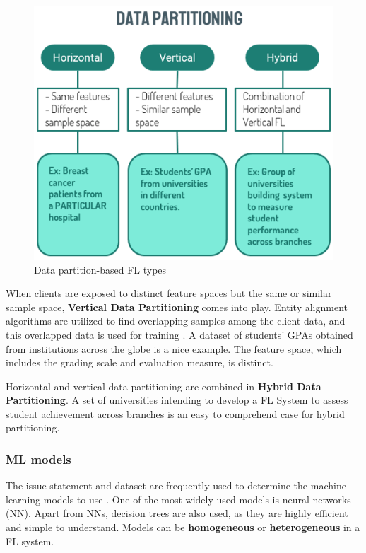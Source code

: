 \begin{figure}[H]
\centering
\includegraphics[scale=0.5]{img/fl_data_partition.png}
\caption{Data partition-based FL types}
\label{fig:fl_data_partition}
\end{figure}

When clients are exposed to distinct feature spaces but the same or similar sample space, \textbf{Vertical Data Partitioning} comes into play. Entity alignment algorithms are utilized to find overlapping samples among the client data, and this overlapped data is used for training \cite{fl26_types}. A dataset of students' GPAs obtained from institutions across the globe is a nice example. The feature space, which includes the grading scale and evaluation measure, is distinct.

Horizontal and vertical data partitioning are combined in \textbf{Hybrid Data Partitioning}. A set of universities intending to develop a FL System to assess student achievement across branches is an easy to comprehend case for hybrid partitioning.

\subsubsection{ML models}

The issue statement and dataset are frequently used to determine the machine learning models to use \cite{fl26_types}. One of the most widely used models is neural networks (NN). Apart from NNs, decision trees are also used, as they are highly efficient and simple to understand. Models can be \textbf{homogeneous} or \textbf{heterogeneous} in a FL system. 


